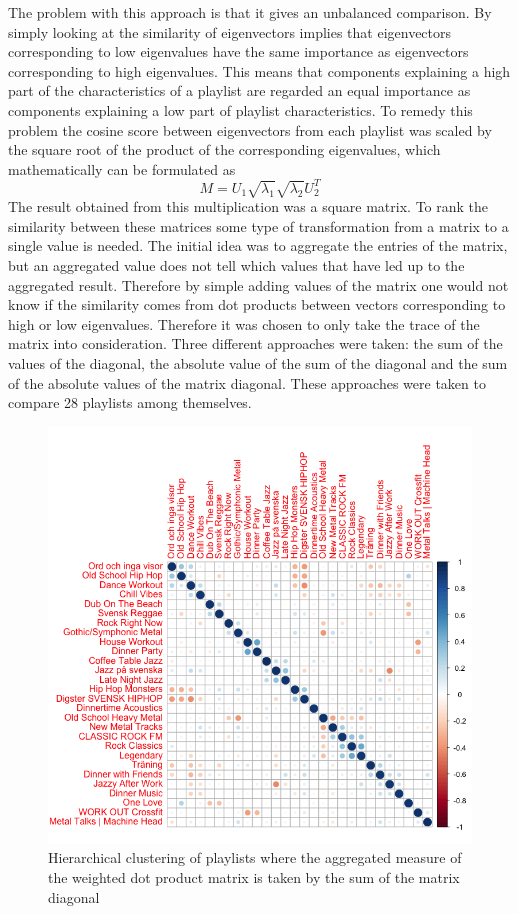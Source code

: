 \documentclass[a4paper,11pt]{kth-mag}
\begin{document}
The problem with this approach is that it gives an unbalanced comparison. By simply looking at the similarity of eigenvectors implies that eigenvectors corresponding to low eigenvalues have the same importance as eigenvectors corresponding to high eigenvalues. This means that components explaining a high part of the characteristics of a playlist are regarded an equal importance as components explaining a low part of playlist characteristics. To remedy this problem the cosine score between eigenvectors from each playlist was scaled by the square root of the product of the corresponding eigenvalues, which mathematically can be formulated as  \[M = U_1 \sqrt{\lambda_1} \sqrt{\lambda_2} U_2^T \] The result obtained from this multiplication was a square matrix. To rank the similarity between these matrices some type of transformation from a matrix to a single value is needed. The initial idea was to aggregate the entries of the matrix, but an aggregated value does not tell which values that have led up to the aggregated result. Therefore by simple adding values of the matrix one would not know if the similarity comes from dot products between vectors corresponding to high or low eigenvalues. Therefore it was chosen to only take the trace of the matrix into consideration. Three different approaches were taken: the sum of the values of the diagonal, the absolute value of the sum of the diagonal and the sum of the absolute values of the matrix diagonal. These approaches were taken to compare 28 playlists among themselves.

\begin{figure}
\includegraphics[scale=0.5]{images/sum.png}
\caption{Hierarchical clustering of playlists where the aggregated measure of the weighted dot product matrix is taken by the sum of the matrix diagonal}
\end{figure}
\end{document}
